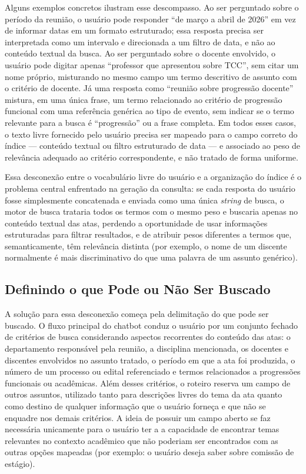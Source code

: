 Alguns exemplos concretos ilustram esse descompasso. Ao ser perguntado sobre o período da reunião, o usuário pode responder ``de março a abril de 2026'' em vez de informar datas em um formato estruturado; essa resposta precisa ser interpretada como um intervalo e direcionada a um filtro de data, e não ao conteúdo textual da busca. Ao ser perguntado sobre o docente envolvido, o usuário pode digitar apenas ``professor que apresentou sobre TCC'', sem citar um nome próprio, misturando no mesmo campo um termo descritivo de assunto com o critério de docente. Já uma resposta como ``reunião sobre progressão docente'' mistura, em uma única frase, um termo relacionado ao critério de progressão funcional com uma referência genérica ao tipo de evento, sem indicar se o termo relevante para a busca é ``progressão'' ou a frase completa. Em todos esses casos, o texto livre fornecido pelo usuário precisa ser mapeado para o campo correto do índice — conteúdo textual ou filtro estruturado de data — e associado ao peso de relevância adequado ao critério correspondente, e não tratado de forma uniforme.

Essa desconexão entre o vocabulário livre do usuário e a organização do índice é o problema central enfrentado na geração da consulta: se cada resposta do usuário fosse simplesmente concatenada e enviada como uma única \textit{string} de busca, o motor de busca trataria todos os termos com o mesmo peso e buscaria apenas no conteúdo textual das atas, perdendo a oportunidade de usar informações estruturadas para filtrar resultados, e de atribuir pesos diferentes a termos que, semanticamente, têm relevância distinta (por exemplo, o nome de um discente normalmente é mais discriminativo do que uma palavra de um assunto genérico).

\subsection{Definindo o que Pode ou Não Ser Buscado}

A solução para essa desconexão começa pela delimitação do que pode ser buscado. O fluxo principal do chatbot conduz o usuário por um conjunto fechado de critérios de busca considerando aspectos recorrentes do conteúdo das atas: o departamento responsável pela reunião, a disciplina mencionada, os docentes e discentes envolvidos no assunto tratado, o período em que a ata foi produzida, o número de um processo ou edital referenciado e termos relacionados a progressões funcionais ou acadêmicas. Além desses critérios, o roteiro reserva um campo de outros assuntos, utilizado tanto para descrições livres do tema da ata quanto como destino de qualquer informação que o usuário forneça e que não se enquadre nos demais critérios. A ideia de possuir um campo aberto se faz necessária unicamente para o usuário ter a a capacidade de encontrar temas relevantes no contexto acadêmico que não poderiam ser encontrados com as outras opções mapeadas (por exemplo: o usuário deseja saber sobre comissão de estágio).

